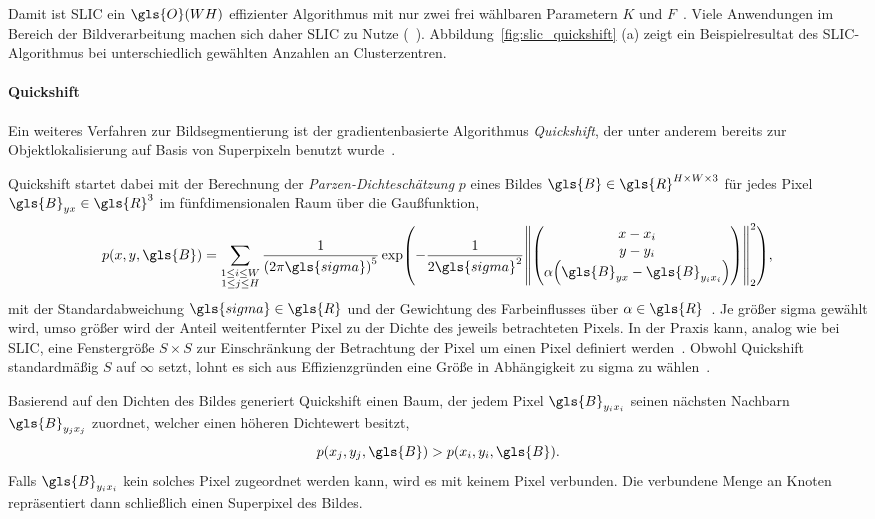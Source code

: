 Damit ist \gls{SLIC} ein $\gls{O}\left(WH\right)$ effizienter Algorithmus mit nur zwei frei wählbaren Parametern $K$ und $F$~\cite{slic}.
Viele Anwendungen im Bereich der Bildverarbeitung machen sich daher \gls{SLIC} zu Nutze (\vgl{}~\cite{Gadde, supercnn, super}).
Abbildung~\ref{fig:slic_quickshift} (a) zeigt ein Beispielresultat des \gls{SLIC}-Algorithmus bei unterschiedlich gewählten Anzahlen an Clusterzentren.



\paragraph{Quickshift}
\label{quickshift}

Ein weiteres Verfahren zur Bildsegmentierung ist der gradientenbasierte Algorithmus \emph{Quickshift}, der unter anderem bereits zur Objektlokalisierung auf Basis von Superpixeln benutzt wurde~\cite{quickshift,Fulkerson}.

Quickshift startet dabei mit der Berechnung der \emph{Parzen-Dichteschätzung} $p$ eines Bildes $\gls{B} \in \gls{R}^{H \times W \times 3}$ für jedes Pixel $\gls{B}_{yx} \in \gls{R}^3$ im fünfdimensionalen Raum über die Gaußfunktion, \dhe{}
\begin{equation*}
  p\left(x,y, \gls{B}\right) = \sum_{\substack{1 \leq i \leq W\\1 \leq j \leq H}}
  \frac{1}{{\left(2\pi\gls{sigma}\right)}^5} \exp\left(-\frac{1}{2\gls{sigma}^2}{\left\|\begin{pmatrix}
    x - x_i\\
    y - y_i\\
    \alpha \left(\gls{B}_{yx} - \gls{B}_{y_i x_i}\right)
  \end{pmatrix}\right\|}_2^2\right),
\end{equation*}
mit der Standardabweichung $\gls{sigma} \in \gls{R}$ und der Gewichtung des Farbeinflusses über $\alpha \in \gls{R}$~\cite{quickshift}.
Je größer \gls{sigma} gewählt wird, umso größer wird der Anteil weitentfernter Pixel zu der Dichte des jeweils betrachteten Pixels.
In der Praxis kann, analog wie bei \gls{SLIC}, eine Fenstergröße $S \times S$ zur Einschränkung der Betrachtung der Pixel um einen Pixel definiert werden~\cite{super}.
Obwohl Quickshift standardmäßig $S$ auf $\infty$ setzt, lohnt es sich aus Effizienzgründen eine Größe in Abhängigkeit zu \gls{sigma} zu wählen~\cite{quickshift}.

Basierend auf den Dichten des Bildes generiert Quickshift einen Baum, der jedem Pixel $\gls{B}_{y_i x_i}$ seinen nächsten Nachbarn $\gls{B}_{y_j x_j}$ zuordnet, welcher einen höheren Dichtewert besitzt, \dhe{}
\begin{equation*}
  p\left(x_j, y_j, \gls{B}\right) > p\left(x_i, y_i, \gls{B}\right).
\end{equation*}
Falls $\gls{B}_{y_i x_i}$ kein solches Pixel zugeordnet werden kann, wird es mit keinem Pixel verbunden.
Die verbundene Menge an Knoten repräsentiert dann schließlich einen Superpixel des Bildes.

